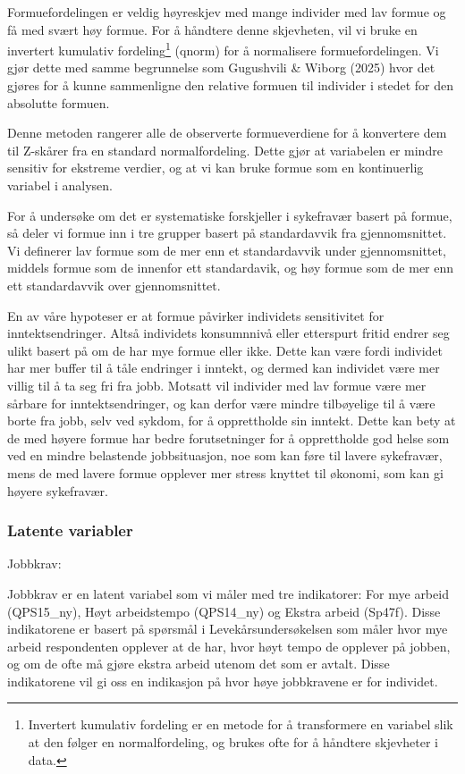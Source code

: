 \documentclass[
  12pt,
  a4paper,
  DIV=11,
  numbers=noendperiod]{scrartcl}
\begin{document}
Formuefordelingen er veldig høyreskjev med mange individer med lav
formue og få med svært høy formue. For å håndtere denne skjevheten, vil
vi bruke en invertert kumulativ fordeling\footnote{Invertert kumulativ
  fordeling er en metode for å transformere en variabel slik at den
  følger en normalfordeling, og brukes ofte for å håndtere skjevheter i
  data.} (qnorm) for å normalisere formuefordelingen. Vi gjør dette med
samme begrunnelse som Gugushvili \& Wiborg (2025) hvor det gjøres for å
kunne sammenligne den relative formuen til individer i stedet for den
absolutte formuen.

Denne metoden rangerer alle de observerte formueverdiene for å
konvertere dem til Z-skårer fra en standard normalfordeling. Dette gjør
at variabelen er mindre sensitiv for ekstreme verdier, og at vi kan
bruke formue som en kontinuerlig variabel i analysen.

For å undersøke om det er systematiske forskjeller i sykefravær basert
på formue, så deler vi formue inn i tre grupper basert på standardavvik
fra gjennomsnittet. Vi definerer lav formue som de mer enn et
standardavvik under gjennomsnittet, middels formue som de innenfor ett
standardavik, og høy formue som de mer enn ett standardavvik over
gjennomsnittet.

En av våre hypoteser er at formue påvirker individets sensitivitet for
inntektsendringer. Altså individets konsumnnivå eller etterspurt fritid
endrer seg ulikt basert på om de har mye formue eller ikke. Dette kan
være fordi individet har mer buffer til å tåle endringer i inntekt, og
dermed kan individet være mer villig til å ta seg fri fra jobb. Motsatt
vil individer med lav formue være mer sårbare for inntektsendringer, og
kan derfor være mindre tilbøyelige til å være borte fra jobb, selv ved
sykdom, for å opprettholde sin inntekt. Dette kan bety at de med høyere
formue har bedre forutsetninger for å opprettholde god helse som ved en
mindre belastende jobbsituasjon, noe som kan føre til lavere sykefravær,
mens de med lavere formue opplever mer stress knyttet til økonomi, som
kan gi høyere sykefravær.

\subsubsection{Latente variabler}\label{latente-variabler}

Jobbkrav:

Jobbkrav er en latent variabel som vi måler med tre indikatorer: For mye
arbeid (QPS15\_ny), Høyt arbeidstempo (QPS14\_ny) og Ekstra arbeid
(Sp47f). Disse indikatorene er basert på spørsmål i
Levekårsundersøkelsen som måler hvor mye arbeid respondenten opplever at
de har, hvor høyt tempo de opplever på jobben, og om de ofte må gjøre
ekstra arbeid utenom det som er avtalt. Disse indikatorene vil gi oss en
indikasjon på hvor høye jobbkravene er for individet.
\end{document}
